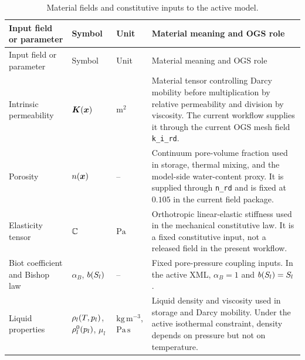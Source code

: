 \begingroup
\small
\setlength{\tabcolsep}{3pt}
\begin{longtable}{@{}L{0.20\textwidth} L{0.16\textwidth} L{0.16\textwidth} L{0.38\textwidth}@{}}
\caption{Material fields and constitutive inputs to the active model.}
\label{tab:material-input-fields}\\
\toprule
Input field or parameter & Symbol & Unit & Material meaning and OGS role\\
\midrule
\endfirsthead
\toprule
Input field or parameter & Symbol & Unit & Material meaning and OGS role\\
\midrule
\endhead
\bottomrule
\endlastfoot
Intrinsic permeability &
\(\bm{K}(\bm{x})\) &
\(\mathrm{m^2}\) &
Material tensor controlling Darcy mobility before multiplication by relative
permeability and division by viscosity.  The current workflow supplies it through
the current OGS mesh field \texttt{k\_i\_rd}.\\
Porosity &
\(n(\bm{x})\) &
-- &
Continuum pore-volume fraction used in storage, thermal mixing, and the
model-side water-content proxy.  It is supplied through \texttt{n\_rd} and is fixed
at \(0.105\) in the current field package.\\
Elasticity tensor &
\(\mathbb{C}\) &
\(\mathrm{Pa}\) &
Orthotropic linear-elastic stiffness used in the mechanical constitutive law.  It is
a fixed constitutive input, not a released field in the present workflow.\\
Biot coefficient and Bishop law &
\(\alpha_B\), \(b(S_l)\) &
-- &
Fixed pore-pressure coupling inputs.  In the active XML, \(\alpha_B=1\) and
\(b(S_l)=S_l\).\\
Liquid properties &
\(\rho_l(T,p_l)\), \(\rho_l^0(p_l)\), \(\mu_l\) &
\(\mathrm{kg\,m^{-3}}\), \(\mathrm{Pa\,s}\) &
Liquid density and viscosity used in storage and Darcy mobility.  Under the active
isothermal constraint, density depends on pressure but not on temperature.\\
\end{longtable}
\endgroup

